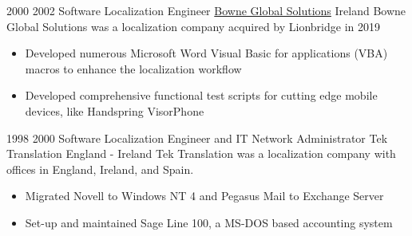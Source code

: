 \begin{twenty}
\twentyitem
  {2000}
  {2002}
  {Software Localization Engineer}
  {\href{https://www.lionbridge.com/}{Bowne Global Solutions}}
  {Ireland}
  {Bowne Global Solutions was a localization company acquired by Lionbridge in 2019}
  {}
  {\begin{itemize}
    \item Developed numerous Microsoft Word Visual Basic for applications (VBA) macros to enhance the localization workflow
    \item Developed comprehensive functional test scripts for cutting edge mobile devices, like Handspring VisorPhone
  \end{itemize}
  }
\end{twenty}

\begin{twenty}
\twentyitem
  {1998}
  {2000}
  {Software Localization Engineer and IT Network Administrator}
  {Tek Translation}
  {England - Ireland}
  {Tek Translation was a localization company with offices in England, Ireland, and Spain.}
  {}
  {\begin{itemize}
    \item Migrated Novell to Windows NT 4 and Pegasus Mail to Exchange Server
    \item Set-up and maintained Sage Line 100, a MS-DOS based accounting system
  \end{itemize}
  }
\end{twenty}
